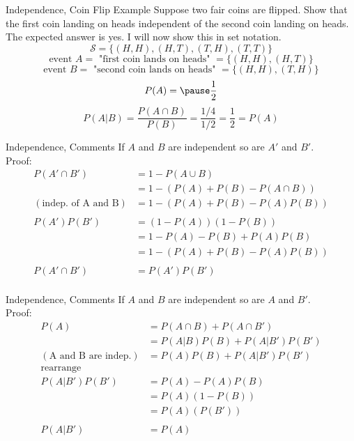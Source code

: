 \documentclass[handout]{beamer}
\newcommand{\nl}[1]{\vspace{#1 em}}
\begin{document}
\begin{frame}{Independence, Coin Flip Example}
    Suppose two fair coins are flipped. Show that the first coin landing on heads independent of the second coin landing on heads.\\ \nl{0.5}
    \pause The expected answer is yes. I will now show this in set notation.
    \pause $$\mathcal{S} = \{ (H,H), (H,T), (T,H), (T,T) \} $$
    \pause $$ \text{event } A = \text{ "first coin lands on heads" } = \{ (H,H),(H,T)\}$$
    $$ \text{event } B = \text{ "second coin lands on heads" } = \{ (H,H),(T,H)\}$$
    \pause $$ P(A) = \pause \frac{1}{2}$$
    $$ P(A|B) = \frac{P(A\cap B)}{P(B)} = \frac{1/4}{1/2} = \frac{1}{2} = P(A)$$
\end{frame}

\begin{frame}{Independence, Comments}
    If $A$ and $B$ are independent so are $A'$ and $B'$.\\ \nl{0.5}
    \pause Proof:
    \begin{align*}
        P(A' \cap B') & = 1 - P(A \cup B) \\
        & = 1 -(P(A) + P(B) - P(A\cap B)) \\
       (\text{indep. of A and B}) & = 1 - (P(A) + P(B) - P(A)P(B)) \\
       & \\
       P(A') P(B')& = (1-P(A))(1-P(B)) \\
        & = 1 - P(A) - P(B) + P(A)P(B)\\
        & = 1 - (P(A) + P(B) - P(A)P(B))\\
        & \\
        P(A' \cap B' ) & = P(A') P(B')\\
    \end{align*}
\end{frame}

\begin{frame}{Independence, Comments}
    If $A$ and $B$ are independent so are $A$ and $B'$.\\ \nl{0.5}
    \pause Proof:
    \begin{align*}
        P(A) &= P(A\cap B) + P(A \cap B')\\
         & = P(A|B)P(B) + P(A|B')P(B')\\
         (\text{A and B are indep.})& = P(A)P(B) + P(A|B')P(B')\\
         \text{rearrange}& \\
        P(A|B')P(B') & = P(A) - P(A)P(B)\\
         & = P(A)(1 - P(B))\\
         & = P(A)(P(B'))\\
         & \\
         P(A|B') &= P(A) \\
    \end{align*}
\end{frame}
\end{document}
